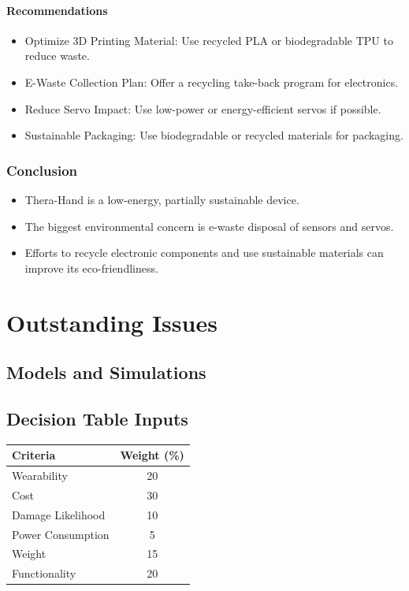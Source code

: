 \documentclass{article}
\begin{document}
\paragraph{Recommendations}
\begin{itemize}
    \item Optimize 3D Printing Material: Use recycled PLA or biodegradable TPU to reduce waste.
    \item E-Waste Collection Plan: Offer a recycling take-back program for electronics.
    \item Reduce Servo Impact: Use low-power or energy-efficient servos if possible.
    \item Sustainable Packaging: Use biodegradable or recycled materials for packaging.
\end{itemize}

\subsubsection{Conclusion}
\begin{itemize}
\item Thera-Hand is a low-energy, partially sustainable device.
\item The biggest environmental concern is e-waste disposal of sensors and servos.
\item Efforts to recycle electronic components and use sustainable materials can improve its
eco-friendliness.
\end{itemize}

\section{Outstanding Issues}


\subsection{Models and Simulations}





\subsection{Decision Table Inputs}

\begin{table}[h]
    \centering
    \begin{tabular}{l c}
        \toprule
        \textbf{Criteria} & \textbf{Weight (\%)} \\
        \midrule
        Wearability & 20 \\
        Cost & 30 \\
        Damage Likelihood & 10 \\
        Power Consumption & 5 \\
        Weight & 15 \\
        Functionality & 20 \\
        \bottomrule
    \end{tabular}
\end{table}
\end{document}
